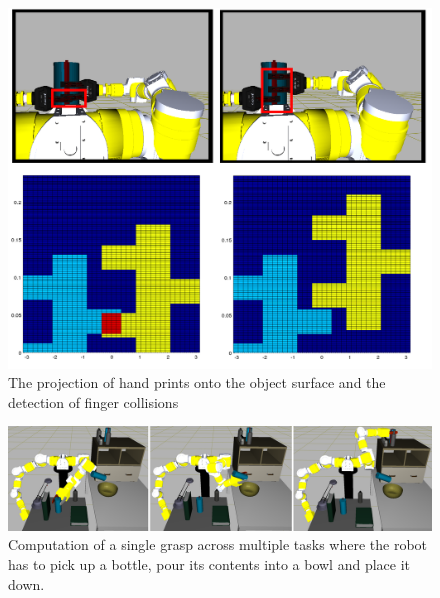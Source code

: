 \documentclass[a4paper,10pt,twocolumn]{article}
\begin{document}
\begin{figure}[t]
  \begin{center}
    \includegraphics[width=1.0\linewidth]{./images/prints.png} \quad 
  \end{center}
  \caption{The projection of hand prints onto the object surface and the detection of finger collisions}
  \label{fig:prints}
\end{figure}


\begin{figure}[t]
  \begin{center}
    \includegraphics[width=0.85\linewidth]{./images/sequence.png} \quad 
  \end{center}
  \caption{Computation of a single grasp across multiple tasks where the robot has to pick up a bottle, pour its contents into a bowl and place it down.}
  \label{fig:sequence}
\end{figure}
\end{document}

